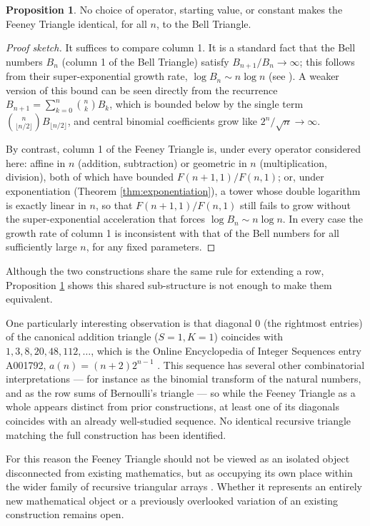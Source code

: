 \documentclass[11pt]{article}
\theoremstyle{definition}
\newtheorem{proposition}{Proposition}[section]
\begin{document}
\begin{proposition}\label{prop:bell}
No choice of operator, starting value, or constant makes the Feeney Triangle identical, for all $n$, to the Bell Triangle.
\end{proposition}

\begin{proof}[Proof sketch]
It suffices to compare column 1. It is a standard fact that the Bell numbers $B_n$ (column 1 of the Bell Triangle) satisfy $B_{n+1}/B_n \to \infty$; this follows from their super-exponential growth rate, $\log B_n \sim n\log n$ (see \cite{stanley}). A weaker version of this bound can be seen directly from the recurrence $B_{n+1} = \sum_{k=0}^n \binom{n}{k}B_k$, which is bounded below by the single term $\binom{n}{\lfloor n/2\rfloor}B_{\lfloor n/2\rfloor}$, and central binomial coefficients grow like $2^n/\sqrt n \to \infty$.

By contrast, column 1 of the Feeney Triangle is, under every operator considered here: affine in $n$ (addition, subtraction) or geometric in $n$ (multiplication, division), both of which have bounded $F(n+1,1)/F(n,1)$; or, under exponentiation (Theorem \ref{thm:exponentiation}), a tower whose double logarithm is exactly linear in $n$, so that $F(n+1,1)/F(n,1)$ still fails to grow without the super-exponential acceleration that forces $\log B_n\sim n\log n$. In every case the growth rate of column 1 is inconsistent with that of the Bell numbers for all sufficiently large $n$, for any fixed parameters.
\end{proof}

Although the two constructions share the same rule for extending a row, Proposition \ref{prop:bell} shows this shared sub-structure is not enough to make them equivalent.

One particularly interesting observation is that diagonal 0 (the rightmost entries) of the canonical addition triangle ($S=1,K=1$) coincides with $1,3,8,20,48,112,\dots$, which is the Online Encyclopedia of Integer Sequences entry A001792, $a(n)=(n+2)2^{n-1}$ \cite{oeis-a001792}. This sequence has several other combinatorial interpretations --- for instance as the binomial transform of the natural numbers, and as the row sums of Bernoulli's triangle --- so while the Feeney Triangle as a whole appears distinct from prior constructions, at least one of its diagonals coincides with an already well-studied sequence. No identical recursive triangle matching the full construction has been identified.

For this reason the Feeney Triangle should not be viewed as an isolated object disconnected from existing mathematics, but as occupying its own place within the wider family of recursive triangular arrays \cite{concrete-math}. Whether it represents an entirely new mathematical object or a previously overlooked variation of an existing construction remains open.
\end{document}
